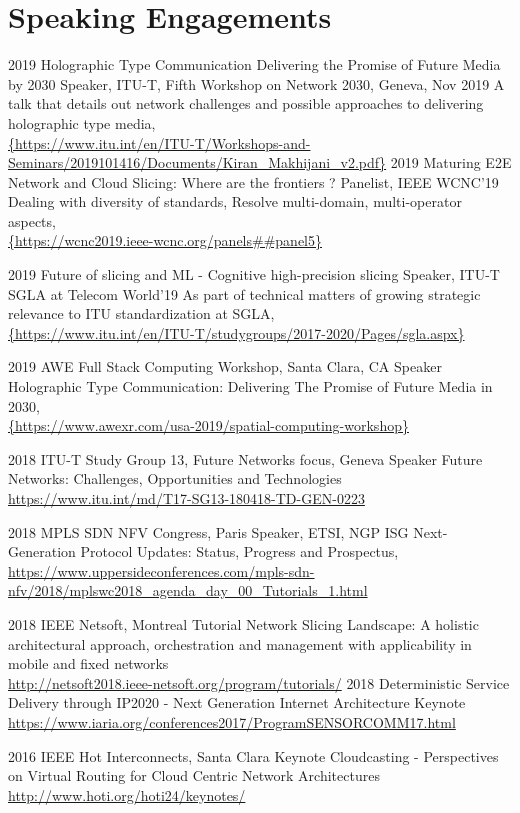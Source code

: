 \section{Speaking Engagements}

\begin{entrylist}
\entry
{2019}
{Holographic Type Communication Delivering the Promise of Future Media by 2030}
{Speaker, ITU-T, Fifth Workshop on Network 2030, Geneva, Nov 2019}
{A talk that details out network challenges and possible approaches to delivering holographic type media,\\ \url{{https://www.itu.int/en/ITU-T/Workshops-and-Seminars/2019101416/Documents/Kiran_Makhijani_v2.pdf}}}
\entry
{2019}
{Maturing E2E Network and Cloud Slicing: Where are the frontiers ?}
{Panelist, IEEE WCNC'19}
{Dealing with diversity of standards, Resolve multi-domain, multi-operator aspects,\\ \url{{https://wcnc2019.ieee-wcnc.org/panels##panel5}}}

\entry
{2019}
{Future of slicing and ML - Cognitive high-precision slicing}
{Speaker, ITU-T SGLA at Telecom World'19}
{As part of technical matters of growing strategic relevance to ITU standardization at SGLA,\\ \url{{https://www.itu.int/en/ITU-T/studygroups/2017-2020/Pages/sgla.aspx}}}


\entry
{2019}
{AWE Full Stack Computing Workshop, Santa Clara, CA}
{Speaker}
{Holographic Type Communication: Delivering The Promise of Future Media in 2030,\\ 
\url{{https://www.awexr.com/usa-2019/spatial-computing-workshop}}}

\entry
{2018}
{ITU-T Study Group 13, Future Networks focus, Geneva}
{Speaker}
{Future Networks: Challenges, Opportunities and Technologies\\ \url{https://www.itu.int/md/T17-SG13-180418-TD-GEN-0223}}

\entry
{2018}
{MPLS SDN NFV Congress, Paris}
{Speaker, ETSI, NGP ISG}
{Next-Generation Protocol Updates: Status, Progress and Prospectus,\\ \url{https://www.uppersideconferences.com/mpls-sdn-nfv/2018/mplswc2018_agenda_day_00_Tutorials_1.html}}

\entry
{2018}
{IEEE Netsoft, Montreal}
{Tutorial}
{Network Slicing Landscape: A holistic architectural approach, orchestration and management with applicability in mobile and fixed networks\\
\url{http://netsoft2018.ieee-netsoft.org/program/tutorials/}}
\entry
{2018} 
{Deterministic Service Delivery through IP2020 - Next Generation Internet Architecture}
{Keynote}
{\url{https://www.iaria.org/conferences2017/ProgramSENSORCOMM17.html}}

\entry
{2016}
{IEEE Hot Interconnects, Santa Clara}
{Keynote}
{Cloudcasting - Perspectives on Virtual Routing for Cloud Centric Network Architectures
\url{http://www.hoti.org/hoti24/keynotes/}}

\end{entrylist}

